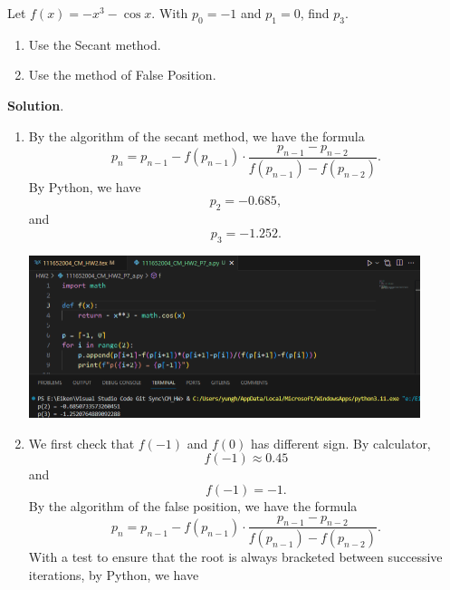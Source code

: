 \documentclass[11pt]{article}
\theoremstyle{break}
\numberwithin{equation}{theorem}
\begin{document}
\newpage
\begin{problem}\label{problem 7}
    Let $f(x)=-x^3-\cos x$. With $p_0=-1$ and $p_1=0$, find $p_3$.
    \begin{enumerate}
        \item Use the Secant method.
        \item Use the method of False Position.
    \end{enumerate}
\end{problem}
\textbf{Solution}.
\begin{enumerate}
    \item By the algorithm of the secant method, we have the formula
    \begin{equation*}
        p_n=p_{n-1}-f(p_{n-1})\cdot\dfrac{p_{n-1}-p_{n-2}}{f(p_{n-1})-f(p_{n-2})}.
    \end{equation*}
    By Python, we have
    \begin{equation*}
        p_2=-0.685,
    \end{equation*}
    and
    \begin{equation*}
        p_3=-1.252.
    \end{equation*}
    \begin{center}
        \includegraphics[width=0.9\textwidth]{problem_7a_py.png}
    \end{center}
    \item We first check that $f(-1)$ and $f(0)$ has different sign. By calculator,
    \begin{equation*}
        f(-1)\approx0.45
    \end{equation*}
    and
    \begin{equation*}
        f(-1)=-1.
    \end{equation*}
    By the algorithm of the false position, we have the formula
    \begin{equation*}
        p_n=p_{n-1}-f(p_{n-1})\cdot\dfrac{p_{n-1}-p_{n-2}}{f(p_{n-1})-f(p_{n-2})}.
    \end{equation*}
    With a test to ensure that the root is always bracketed between successive iterations, by Python, we have

\end{enumerate}
\end{document}
